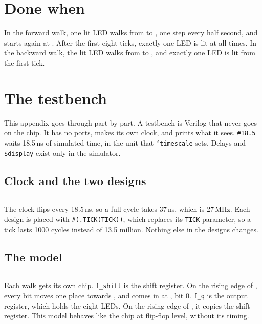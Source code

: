 \documentclass[11pt,a4paper]{article}
\begin{document}
\section*{Done when}

In the forward walk, one lit LED walks from  to , one step every half second, and starts again at . After the first eight ticks, exactly one LED is lit at all times. In the backward walk, the lit LED walks from  to , and exactly one LED is lit from the first tick.

\appendix
\section{The testbench}\label{app:testbench}

This appendix goes through  part by part. A testbench is Verilog that never goes on the chip. It has no ports, makes its own clock, and prints what it sees. \texttt{\#18.5} waits 18.5\,ns of simulated time, in the unit that \texttt{`timescale} sets. Delays and \texttt{\$display} exist only in the simulator.

\subsection*{Clock and the two designs}

\inputminted[firstline=7, lastline=20]{verilog}{../sim/walk_tb.v}

The clock flips every 18.5\,ns, so a full cycle takes 37\,ns, which is 27\,MHz. Each design is placed with \texttt{\#(.TICK(TICK))}, which replaces its \texttt{TICK} parameter, so a tick lasts 1000 cycles instead of 13.5 million. Nothing else in the designs changes.

\subsection*{The  model}

\inputminted[firstline=22, lastline=29]{verilog}{../sim/walk_tb.v}

Each walk gets its own chip. \texttt{f\_shift} is the shift register. On the rising edge of , every bit moves one place towards , and  comes in at , bit 0. \texttt{f\_q} is the output register, which holds the eight LEDs. On the rising edge of , it copies the shift register. This model behaves like the chip at flip-flop level, without its timing.
\end{document}
